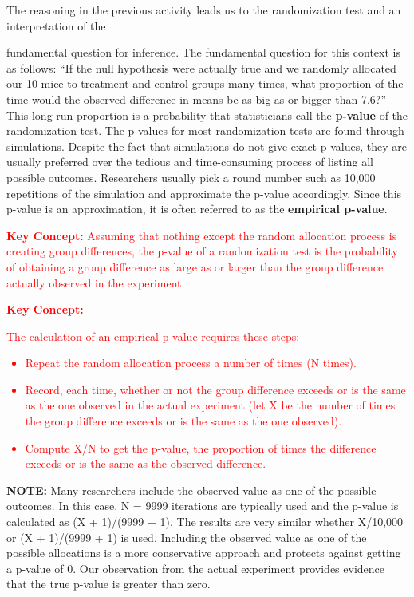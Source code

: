 \documentclass[
]{report}
\begin{document}
The reasoning in the previous activity leads us to the randomization test and an interpretation of the

fundamental question for inference. The fundamental question for this context is as follows: ``If the null
hypothesis were actually true and we randomly allocated our 10 mice to treatment and control groups many
times, what proportion of the time would the observed difference in means be as big as or bigger than 7.6?''
This long-run proportion is a probability that statisticians call the \textbf{p-value} of the randomization test. The
p-values for most randomization tests are found through simulations. Despite the fact that simulations do
not give exact p-values, they are usually preferred over the tedious and time-consuming process of listing
all possible outcomes. Researchers usually pick a round number such as 10,000 repetitions of the simulation
and approximate the p-value accordingly. Since this p-value is an approximation, it is often referred to as
the \textbf{empirical p-value}.

\Large

\textbf{\textcolor{red}{Key Concept:}}
\textcolor{red}{Assuming that nothing except the random allocation process is creating group differences, the p-value
of a randomization test is the probability of obtaining a group difference as large as or larger than
the group difference actually observed in the experiment.}

\Large

\textbf{\textcolor{red}{Key Concept:}}

\textcolor{red}{The calculation of an empirical p-value requires these steps:
\begin{itemize}
\item Repeat the random allocation process a number of times (N times).
\item Record, each time, whether or not the group difference exceeds or is the same as the one
observed in the actual experiment (let X be the number of times the group difference exceeds
or is the same as the one observed).
\item Compute X/N to get the p-value, the proportion of times the difference exceeds or is the same
as the observed difference.
\end{itemize}}

\large

\textbf{NOTE:}
Many researchers include the observed value as one of the possible outcomes. In this case, N = 9999
iterations are typically used and the p-value is calculated as (X + 1)/(9999 + 1). The results are very
similar whether X/10,000 or (X + 1)/(9999 + 1) is used. Including the observed value as one of the
possible allocations is a more conservative approach and protects against getting a p-value of 0. Our
observation from the actual experiment provides evidence that the true p-value is greater than zero.
\end{document}
